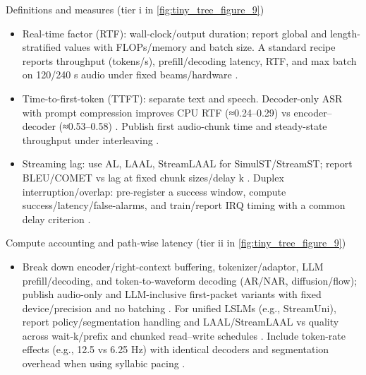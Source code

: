 \documentclass{article}
\begin{document}
Definitions and measures (tier i in \autoref{fig:tiny_tree_figure_9})
\begin{itemize}
  \item Real-time factor (RTF): wall-clock/output duration; report global and length-stratified values with FLOPs/memory and batch size. A standard recipe reports throughput (tokens/s), prefill/decoding latency, RTF, and max batch on 120/240 s audio under fixed beams/hardware \cite{lu2024fastadaspmultitaskadaptedefficientinfere}.
  \item Time-to-first-token (TTFT): separate text and speech. Decoder-only ASR with prompt compression improves CPU RTF (≈0.24–0.29) vs encoder–decoder (≈0.53–0.58) \cite{tsunoo2024decoderonlyarchitecturespeechrecognition}. Publish first audio-chunk time and steady-state throughput under interleaving \cite{lu2024fastadaspmultitaskadaptedefficientinfere}.
  \item Streaming lag: use AL, LAAL, StreamLAAL for SimulST/StreamST; report BLEU/COMET vs lag at fixed chunk sizes/delay k \cite{guo2025streamuniachievingstreamingspeechtransla}. Duplex interruption/overlap: pre-register a success window, compute success/latency/false-alarms, and train/report IRQ timing with a common delay criterion \cite{ma2024languagemodelcanlistenwhilespeaking}.
\end{itemize}

Compute accounting and path-wise latency (tier ii in \autoref{fig:tiny_tree_figure_9})
\begin{itemize}
  \item Break down encoder/right-context buffering, tokenizer/adaptor, LLM prefill/decoding, and token-to-waveform decoding (AR/NAR, diffusion/flow); publish audio-only and LLM-inclusive first-packet variants with fixed device/precision and no batching \cite{entry2025indicsuperbspeechprocessinguniversalperf,vashishth2024stabspeechtokenizerassessmentbenchmark}. For unified LSLMs (e.g., StreamUni), report policy/segmentation handling and LAAL/StreamLAAL vs quality across wait‑k/prefix and chunked read–write schedules \cite{guo2025streamuniachievingstreamingspeechtransla}. Include token-rate effects (e.g., 12.5 vs 6.25 Hz) with identical decoders and segmentation overhead when using syllabic pacing \cite{baade2024syllablelmlearningcoarsesemanticunitsspe}.
\end{itemize}
\end{document}

